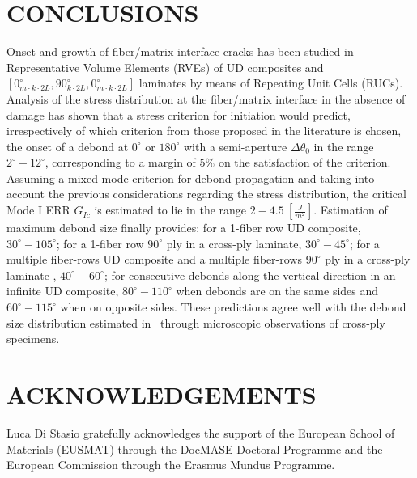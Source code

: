 \documentclass[12pt,a4paper]{article}
\begin{document}
\section{CONCLUSIONS}

Onset and growth of fiber/matrix interface cracks has been studied in Representative Volume Elements (RVEs) of UD composites and $\left[0_{m\cdot k\cdot2L}^{\circ},90_{k\cdot2L}^{\circ},0_{m\cdot k\cdot2L}^{\circ}\right]$ laminates by means of Repeating Unit Cells (RUCs). Analysis of the stress distribution at the fiber/matrix interface in the absence of damage has shown that a stress criterion for initiation would predict, irrespectively of which criterion from those proposed in the literature is chosen, the onset of a debond at $0^{\circ}$ or $180^{\circ}$ with a semi-aperture $\Delta\theta_{0}$ in the range $2^{\circ}-12^{\circ}$, corresponding to a margin of $5\%$ on the satisfaction of the criterion. Assuming a mixed-mode criterion for debond propagation and taking into account the previous considerations regarding the stress distribution, the critical Mode I ERR $G_{Ic}$ is estimated to lie in the range $2-4.5\ \left[\frac{J}{m^{2}}\right]$. Estimation of maximum debond size finally provides: for a 1-fiber row UD composite, $30^{\circ}-105^{\circ}$; for a 1-fiber row $90^{\circ}$ ply in a cross-ply laminate, $30^{\circ}-45^{\circ}$; for a multiple fiber-rows UD composite and a multiple fiber-rows $90^{\circ}$ ply in a cross-ply laminate , $40^{\circ}-60^{\circ}$; for consecutive debonds along the vertical direction in an infinite UD composite, $80^{\circ}-110^{\circ}$ when debonds are on the same sides and $60^{\circ}-115^{\circ}$ when on opposite sides. These predictions agree well with the debond size distribution estimated in~\cite{Correa2018} through microscopic observations of cross-ply specimens.

\section*{ACKNOWLEDGEMENTS}

Luca Di Stasio gratefully acknowledges the support of the European School of Materials (EUSMAT) through the DocMASE Doctoral Programme and the European Commission through the Erasmus Mundus Programme.



%
%


\end{document}

